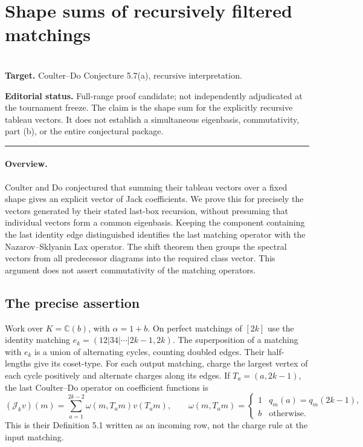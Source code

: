 \documentclass[11pt,a4paper]{article}
\begin{document}
\clearpage

\section{Shape sums of recursively filtered matchings}
\label{section:R24M}
\\[3pt]
\noindent\textbf{Target.} Coulter--Do Conjecture 5.7(a), recursive interpretation.

\noindent\textbf{Editorial status.} Full-range proof candidate; not independently adjudicated at the tournament freeze. The claim is the shape sum for the explicitly recursive tableau vectors. It does not establish a simultaneous eigenbasis, commutativity, part (b), or the entire conjectural package.

\smallskip\hrule\medskip



\begingroup
\newcommand{\ch}{\operatorname{ch}}
\newcommand{\J}{\mathcal J}
\newcommand{\cA}{\mathcal A}
\newcommand{\cR}{\mathcal R}
\setcounter{equation}{0}
\renewcommand{\theequation}{\thesection.\arabic{equation}}
\renewcommand{\theHequation}{R24M.\arabic{equation}}
\paragraph{Overview.}
Coulter and Do conjectured that summing their tableau vectors over a fixed shape gives an explicit vector of Jack coefficients. We prove this for precisely the vectors generated by their stated last-box recursion, without presuming that individual vectors form a common eigenbasis. Keeping the component containing the last identity edge distinguished identifies the last matching operator with the Nazarov--Sklyanin Lax operator. The shift theorem then groups the spectral vectors from all predecessor diagrams into the required class vector. This argument does not assert commutativity of the matching operators.


\subsection{The precise assertion}
Work over $K=\mathbb C(b)$, with $\alpha=1+b$. On perfect matchings of $[2k]$ use the identity matching $e_k=(12|34|\cdots|2k-1,2k)$. The superposition of a matching with $e_k$ is a union of alternating cycles, counting doubled edges. Their half-lengths give its coset-type. For each output matching, charge the largest vertex of each cycle positively and alternate charges along its edges. If $T_a=(a,2k-1)$, the last Coulter--Do operator on coefficient functions is
\[
  (\J_k v)(m)=\sum_{a=1}^{2k-2}
    \omega(m,T_am) v(T_am),\qquad
  \omega(m,T_am)=\begin{cases}1& q_m(a)=q_m(2k-1),\\
                                   b&\text{otherwise}.\end{cases}
\]
This is their Definition 5.1 written as an incoming row, not the charge rule at the input matching.
\end{document}
